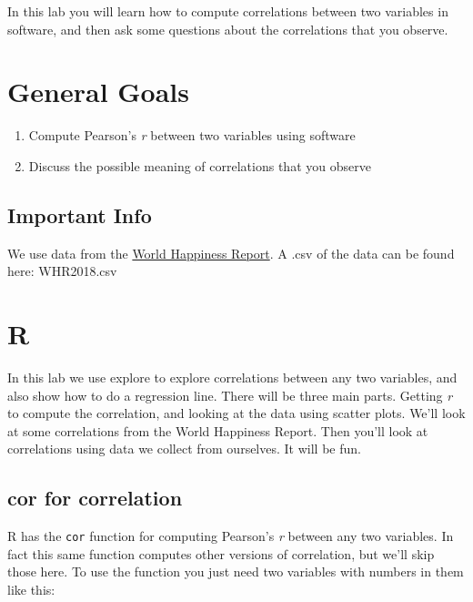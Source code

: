 \documentclass[]{book}
\providecommand{\tightlist}{%
  \setlength{\itemsep}{0pt}\setlength{\parskip}{0pt}}
\begin{document}
In this lab you will learn how to compute correlations between two
variables in software, and then ask some questions about the
correlations that you observe.

\section{General Goals}\label{general-goals-2}

\begin{enumerate}
\def\labelenumi{\arabic{enumi}.}
\tightlist
\item
  Compute Pearson's \emph{r} between two variables using software
\item
  Discuss the possible meaning of correlations that you observe
\end{enumerate}

\subsection{Important Info}\label{important-info-2}

We use data from the \href{http://worldhappiness.report}{World Happiness
Report}. A .csv of the data can be found here: WHR2018.csv

\section{R}\label{r-3}

In this lab we use explore to explore correlations between any two
variables, and also show how to do a regression line. There will be
three main parts. Getting \emph{r} to compute the correlation, and
looking at the data using scatter plots. We'll look at some correlations
from the World Happiness Report. Then you'll look at correlations using
data we collect from ourselves. It will be fun.

\subsection{cor for correlation}\label{cor-for-correlation}

R has the \texttt{cor} function for computing Pearson's \emph{r} between
any two variables. In fact this same function computes other versions of
correlation, but we'll skip those here. To use the function you just
need two variables with numbers in them like this:
\end{document}
